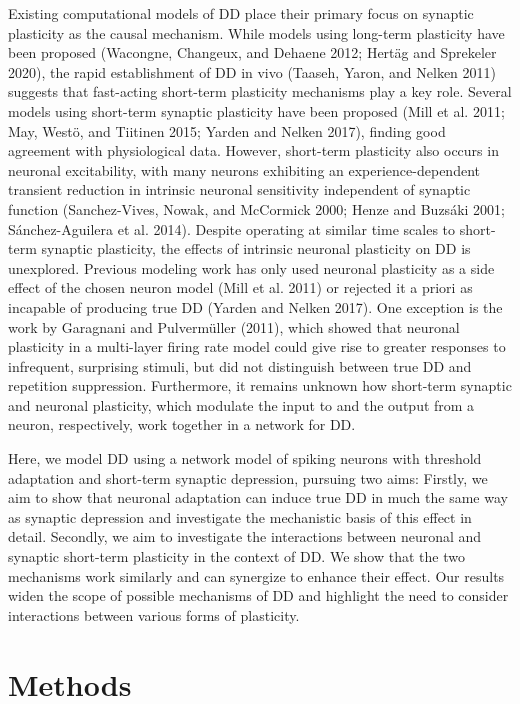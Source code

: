 \documentclass[pdflatex,referee,iicol,sn-basic]{sn-jnl}
\begin{document}
Existing computational models of DD place their primary focus on synaptic plasticity as the causal mechanism. While models using long-term plasticity have been proposed (Wacongne, Changeux, and Dehaene 2012; Hertäg and Sprekeler 2020), the rapid establishment of DD in vivo (Taaseh, Yaron, and Nelken 2011) suggests that fast-acting short-term plasticity mechanisms play a key role. Several models using short-term synaptic plasticity have been proposed (Mill et al. 2011; May, Westö, and Tiitinen 2015; Yarden and Nelken 2017), finding good agreement with physiological data. However, short-term plasticity also occurs in neuronal excitability, with many neurons exhibiting an experience-dependent transient reduction in intrinsic neuronal sensitivity independent of synaptic function (Sanchez-Vives, Nowak, and McCormick 2000; Henze and Buzsáki 2001; Sánchez-Aguilera et al. 2014). Despite operating at similar time scales to short-term synaptic plasticity, the effects of intrinsic neuronal plasticity on DD is unexplored.  Previous modeling work has only used neuronal plasticity as a side effect of the chosen neuron model (Mill et al. 2011) or rejected it a priori as incapable of producing true DD (Yarden and Nelken 2017). One exception is the work by Garagnani and Pulvermüller (2011), which showed that neuronal plasticity in a multi-layer firing rate model could give rise to greater responses to infrequent, surprising stimuli, but did not distinguish between true DD and repetition suppression. Furthermore, it remains unknown how short-term synaptic and neuronal plasticity, which modulate the input to and the output from a neuron, respectively, work together in a network for DD. 

Here, we model DD using a network model of spiking neurons with threshold adaptation and short-term synaptic depression, pursuing two aims: Firstly, we aim to show that neuronal adaptation can induce true DD in much the same way as synaptic depression and investigate the mechanistic basis of this effect in detail. Secondly, we aim to investigate the interactions between neuronal and synaptic short-term plasticity in the context of DD. We show that the two mechanisms work similarly and can synergize to enhance their effect. Our results widen the scope of possible mechanisms of DD and highlight the need to consider interactions between various forms of plasticity.

\section{Methods}\label{sec-methods}
\end{document}
